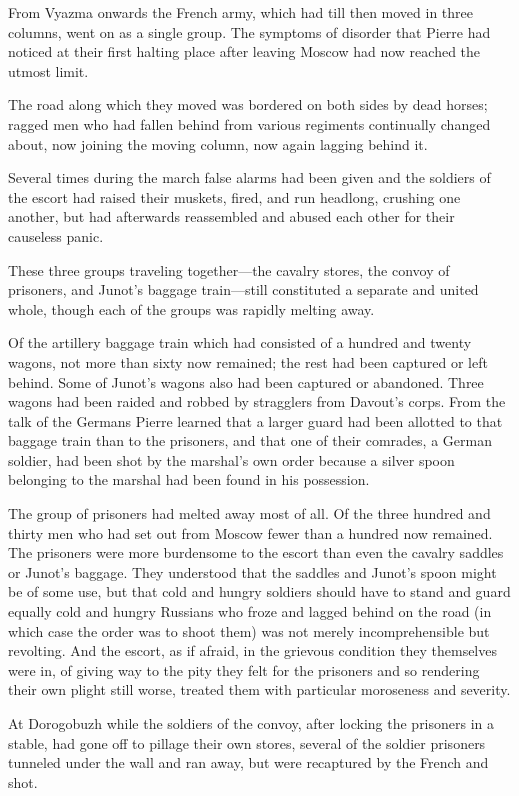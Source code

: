 From Vyazma onwards the French army, which had till then moved in
three columns, went on as a single group. The symptoms of
disorder that Pierre had noticed at their first halting place
after leaving Moscow had now reached the utmost limit.

The road along which they moved was bordered on both sides by
dead horses; ragged men who had fallen behind from various
regiments continually changed about, now joining the moving
column, now again lagging behind it.

Several times during the march false alarms had been given and
the soldiers of the escort had raised their muskets, fired, and
run headlong, crushing one another, but had afterwards
reassembled and abused each other for their causeless panic.

These three groups traveling together---the cavalry stores, the
convoy of prisoners, and Junot's baggage train---still
constituted a separate and united whole, though each of the
groups was rapidly melting away.

Of the artillery baggage train which had consisted of a hundred
and twenty wagons, not more than sixty now remained; the rest had
been captured or left behind. Some of Junot's wagons also had
been captured or abandoned. Three wagons had been raided and
robbed by stragglers from Davout's corps. From the talk of the
Germans Pierre learned that a larger guard had been allotted to
that baggage train than to the prisoners, and that one of their
comrades, a German soldier, had been shot by the marshal's own
order because a silver spoon belonging to the marshal had been
found in his possession.

The group of prisoners had melted away most of all. Of the three
hundred and thirty men who had set out from Moscow fewer than a
hundred now remained. The prisoners were more burdensome to the
escort than even the cavalry saddles or Junot's baggage. They
understood that the saddles and Junot's spoon might be of some
use, but that cold and hungry soldiers should have to stand and
guard equally cold and hungry Russians who froze and lagged
behind on the road (in which case the order was to shoot them)
was not merely incomprehensible but revolting. And the escort, as
if afraid, in the grievous condition they themselves were in, of
giving way to the pity they felt for the prisoners and so
rendering their own plight still worse, treated them with
particular moroseness and severity.

At Dorogobuzh while the soldiers of the convoy, after locking the
prisoners in a stable, had gone off to pillage their own stores,
several of the soldier prisoners tunneled under the wall and ran
away, but were recaptured by the French and shot.

